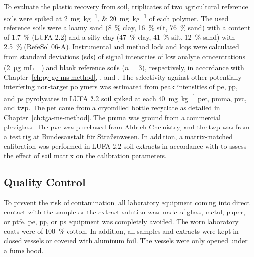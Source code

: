 To evaluate the plastic recovery from soil, triplicates of two agricultural reference soils were spiked at \SIlist{2;20}{\milli\gram\per\kilo\gram} of each polymer. The used reference soils were a loamy sand (\SI{8}{\percent} clay, \SI{16}{\percent} silt, \SI{76}{\percent} sand) with a  content of \SI{1.7}{\percent} (LUFA 2.2)  and a silty clay (\SI{47}{\percent} clay, \SI{41}{\percent} silt, \SI{12}{\percent} sand) with \SI{2.5}{\percent}  (RefeSol 06-A).
Instrumental and method \acp{lod} and \acp{loq} were calculated from standard deviations (\ac{sd}s) of signal intensities of low analyte concentrations (\SI{2}{\micro\gram\per\milli\liter}) and blank reference soils ($n$ = 3), respectively, in accordance with Chapter~\ref{ch:py-gc-ms-method}, \citet{DIN32645Chemical2008}, and \citet{MagnussonEurachem2014}. The selectivity against other potentially interfering non-target polymers was estimated from peak intensities of \ac{pe}, \ac{pp}, and \ac{ps} pyrolysates in LUFA 2.2 soil spiked at each \SI{40}{\milli\gram\per\kilo\gram} \ac{pet}, \ac{pmma}, \ac{pvc}, and \ac{twp}. The \ac{pet} came from a cryomilled bottle recyclate as detailed in Chapter~\ref{ch:tga-ms-method}. The \ac{pmma} was ground from a commercial plexiglass. The \ac{pvc} was purchased from Aldrich Chemistry, and the \ac{twp} was from a test rig at \foreignlanguage{ngerman}{Bundesanstalt für Straßenwesen}.
In addition, a matrix-matched calibration was performed in LUFA 2.2 soil extracts in accordance with \citet{MagnussonEurachem2014} to assess the effect of soil matrix on the calibration parameters.

\subsection{Quality Control}

To prevent the risk of contamination, all laboratory equipment coming into direct contact with the sample or the extract solution was made of glass, metal, paper, or \ac{ptfe}. \ac{pe}, \ac{pp}, or \ac{ps} equipment was completely avoided. The worn laboratory coats were of \SI{100}{\percent} cotton. In addition, all samples and extracts were kept in closed vessels or covered with aluminum foil. The vessels were only opened under a fume hood.

